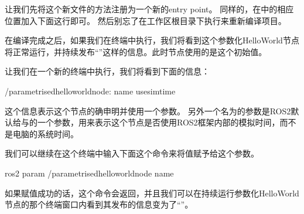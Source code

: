 \documentclass[letterpaper,10pt,english]{sphinxmanual}
\begin{document}
\sphinxAtStartPar
让我们先将这个新文件的方法注册为一个新的entry point。
同样的，在中的相应位置加入下面这行即可。
然后别忘了在工作区根目录下执行来重新编译项目。

\begin{sphinxVerbatim}[commandchars=\\\{\}]
\end{sphinxVerbatim}

\sphinxAtStartPar
在编译完成之后，如果我们在终端中执行，我们将看到这个参数化HelloWorld节点将正常运行，并持续发布“”这样的信息。此时节点使用的是这个初始值。

\sphinxAtStartPar
让我们在一个新的终端中执行，我们将看到下面的信息：

\begin{sphinxVerbatim}[commandchars=\\\{\}]
/parametrised\PYGZus{}hello\PYGZus{}world\PYGZus{}node:
  name
  use\PYGZus{}sim\PYGZus{}time
\end{sphinxVerbatim}

\sphinxAtStartPar
这个信息表示这个节点的确申明并使用一个参数。
另外一个名为的参数是ROS2默认给与的一个参数，用来表示这个节点是否使用ROS2框架内部的模拟时间，而不是电脑的系统时间。

\sphinxAtStartPar
我们可以继续在这个终端中输入下面这个命令来将值赋予给这个参数。

\begin{sphinxVerbatim}[commandchars=\\\{\}]
ros2 param  /parametrised\PYGZus{}hello\PYGZus{}world\PYGZus{}node name 
\end{sphinxVerbatim}

\sphinxAtStartPar
如果赋值成功的话，这个命令会返回，并且我们可以在持续运行参数化HelloWorld节点的那个终端窗口内看到其发布的信息变为了“”。
\end{document}
